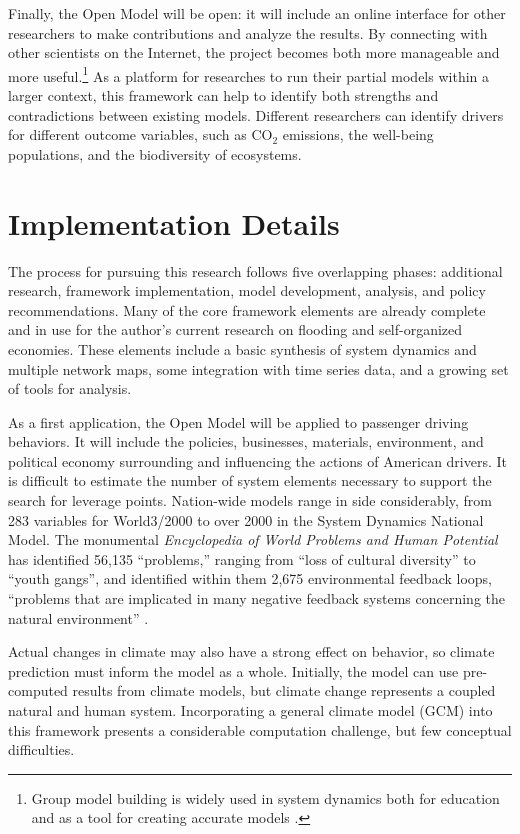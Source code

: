 \documentclass[12pt, oneside]{amsart}
\begin{document}
Finally, the Open Model will be open: it will include an online interface for other researchers to make contributions and analyze the results.  By connecting with other scientists on the Internet, the project becomes both more manageable and more useful.\footnote{Group model building is widely used in system dynamics both for education and as a tool for creating accurate models \citep{rouwette2002group}.}  As a platform for researches to run their partial models within a larger context, this framework can help to identify both strengths and contradictions between existing models.  Different researchers can identify drivers for different outcome variables, such as CO$_2$ emissions, the well-being populations, and the biodiversity of ecosystems.

\section*{Implementation Details}
\label{sec:implementing}

The process for pursuing this research follows five overlapping phases: additional research, framework implementation, model development, analysis, and policy recommendations.  Many of the core framework elements are already complete and in use for the author's current research on flooding and self-organized economies.  These elements include a basic synthesis of system dynamics and multiple network maps, some integration with time series data, and a growing set of tools for analysis.

As a first application, the Open Model will be applied to passenger driving behaviors.  It will include the policies, businesses, materials, environment, and political economy surrounding and influencing the actions of American drivers.  It is difficult to estimate the number of system elements necessary to support the search for leverage points.  Nation-wide models range in side considerably, from 283 variables for World3/2000 to over 2000 in the System Dynamics National Model.  The monumental \emph{Encyclopedia of World Problems and Human Potential} has identified 56,135 ``problems,'' ranging from ``loss of cultural diversity'' to ``youth gangs'', and identified within them 2,675 environmental feedback loops, ``problems that are implicated in many negative feedback systems concerning the natural environment'' \citep{ewphp}.

Actual changes in climate may also have a strong effect on behavior, so climate prediction must inform the model as a whole.  Initially, the model can use pre-computed results from climate models, but climate change represents a coupled natural and human system.  Incorporating a general climate model (GCM) into this framework presents a considerable computation challenge, but few conceptual difficulties.
\end{document}
